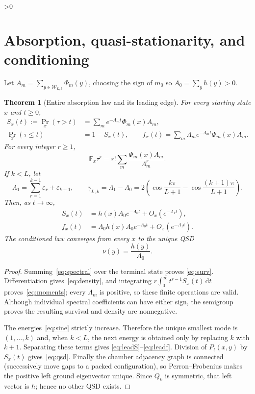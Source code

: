 \documentclass[10pt]{article}
\providecommand{\CRevisionRound}{2}
\newtheorem{theorem}{Theorem}
\newcommand{\W}{\mathcal W}
\newcommand{\E}{\mathbb E}
\newcommand{\1}{\mathbf 1}
\newcommand{\dd}{\mathrm d}
\newcommand{\e}{\varepsilon}
\begin{document}
\ifnum\CRevisionRound>0
\section{Absorption, quasi-stationarity, and conditioning}
Let $A_m=\sum_{y\in\W_{L,k}}\Phi_m(y)$, choosing the sign of $m_0$ so
$A_0=\sum_yh(y)>0$.

\begin{theorem}[Entire absorption law and its leading edge]\label{thm:absorb}
For every starting state $x$ and $t\geq0$,
\begin{align}
 S_x(t):=\Pr_x(\tau>t)&=\sum_m e^{-\Lambda_mt}\Phi_m(x)A_m,\label{eq:surv}\\
 \Pr_x(\tau\leq t)&=1-S_x(t),\qquad
 f_x(t)=\sum_m\Lambda_m e^{-\Lambda_mt}\Phi_m(x)A_m.\label{eq:density}
\end{align}
For every integer $r\geq1$,
\begin{equation}\label{eq:moments}
 \E_x\tau^r=r!\sum_m\frac{\Phi_m(x)A_m}{\Lambda_m^r}.
\end{equation}
If $k<L$, let
\[
 \Lambda_1=\sum_{r=1}^{k-1}\e_r+\e_{k+1},\qquad
 \gamma_{L,k}=\Lambda_1-\Lambda_0
 =2\left(\cos\frac{k\pi}{L+1}-\cos\frac{(k+1)\pi}{L+1}\right).
\]
Then, as $t\to\infty$,
\begin{align}
 S_x(t)&=h(x)A_0e^{-\Lambda_0t}+O_x(e^{-\Lambda_1t}),\label{eq:leadS}\\
 f_x(t)&=\Lambda_0h(x)A_0e^{-\Lambda_0t}+O_x(e^{-\Lambda_1t}).\label{eq:leadf}
\end{align}
The conditioned law converges from every $x$ to the unique QSD
\begin{equation}\label{eq:qsd}
 \nu(y)=\frac{h(y)}{A_0}.
\end{equation}
\end{theorem}

\begin{proof}
Summing~\eqref{eq:spectral} over the terminal state proves
\eqref{eq:surv}.  Differentiation gives~\eqref{eq:density}, and integrating
$r\int_0^\infty t^{r-1}S_x(t)\,\dd t$ proves~\eqref{eq:moments}; every
$\Lambda_m$ is positive, so these finite operations are valid.  Although
individual spectral coefficients can have either sign, the semigroup proves
the resulting survival and density are nonnegative.

The energies~\eqref{eq:sine} strictly increase.  Therefore the unique
smallest mode is $(1,\ldots,k)$ and, when $k<L$, the next energy is obtained
only by replacing $k$ with $k+1$.  Separating these terms gives
\eqref{eq:leadS}--\eqref{eq:leadf}.  Division of
$P_t(x,y)$ by $S_x(t)$ gives~\eqref{eq:qsd}.
Finally the chamber adjacency graph is connected (successively move gaps to
a packed configuration), so Perron--Frobenius makes the positive left ground
eigenvector unique.  Since $Q_k$ is symmetric, that left vector is $h$;
hence no other QSD exists.
\end{proof}
\end{document}
